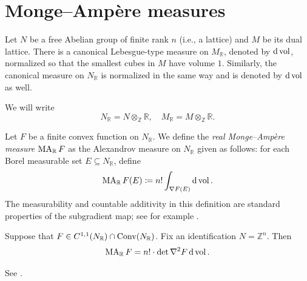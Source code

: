 \section{Monge--Amp\`ere measures}
\label{sec:convex_MA}
Let $N$ be a free Abelian group of finite rank $n$ (i.e., a lattice) and $M$ be its dual lattice. There is a canonical Lebesgue-type measure on $M_{\mathbb{R}}$, denoted by $\mathrm{d}\operatorname{vol}$, normalized so that the smallest cubes in $M$ have volume $1$. Similarly, the canonical measure on $N_{\mathbb{R}}$ is normalized in the same way and is denoted by $\mathrm{d}\operatorname{vol}$ as well.

We will write
\[
N_{\mathbb{R}}=N\otimes_{\mathbb{Z}}\mathbb{R},\quad M_{\mathbb{R}}=M\otimes_{\mathbb{Z}}\mathbb{R}.
\]

\begin{definition}\label{def:realMA}
    Let $F$ be a finite convex function on $N_{\mathbb{R}}$. We define the \emph{real Monge--Ampère measure} $\operatorname{MA}_{\mathbb{R}}F$ as the Alexandrov measure on $N_{\mathbb{R}}$ given as follows: for each Borel measurable set $E\subseteq N_{\mathbb{R}}$, define
    \begin{equation}\label{eq:MARFE}
        \operatorname{MA}_{\mathbb{R}}F(E)\coloneqq n!\int_{\nabla F(E)} \mathrm{d}\operatorname{vol}.
    \end{equation}
    The measurability and countable additivity in this definition are standard properties of the subgradient map; see for example \cite[Section~2.1]{Fig17}.
\end{definition}

\begin{proposition}\label{prop:smoothMAreal}
    Suppose that $F\in C^{1,1}(N_{\mathbb{R}})\cap \mathrm{Conv}(N_{\mathbb{R}})$. Fix an identification $N=\mathbb{Z}^n$. Then
    \[
    \operatorname{MA}_{\mathbb{R}}F=n!\cdot \det \nabla^2 F \,\mathrm{d}\operatorname{vol}.
    \]
\end{proposition}
See \cite[Example~2.2]{Fig17}.

